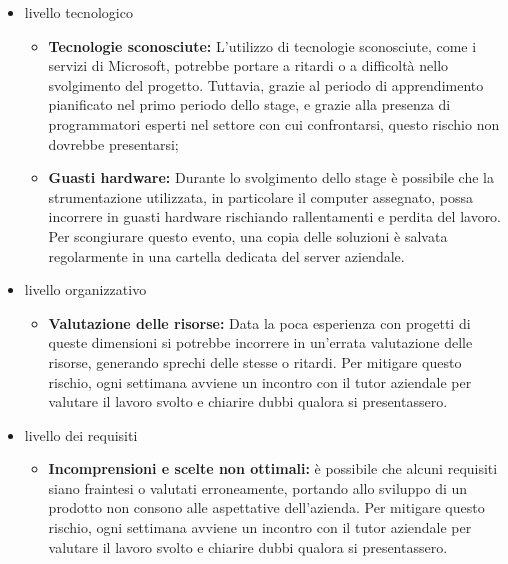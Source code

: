 \begin{itemize}
	\item livello tecnologico
	\begin{itemize}
		\item \textbf{Tecnologie sconosciute:} L'utilizzo di tecnologie sconosciute, come i servizi di Microsoft, potrebbe portare a ritardi o a difficoltà nello svolgimento del progetto. Tuttavia, grazie al periodo di apprendimento pianificato nel primo periodo dello stage, e grazie alla presenza di programmatori esperti nel settore con cui confrontarsi, questo rischio non dovrebbe presentarsi;
		\item \textbf{Guasti hardware:} Durante lo svolgimento dello stage è possibile che la strumentazione utilizzata, in particolare il computer assegnato, possa incorrere in guasti hardware rischiando rallentamenti e perdita del lavoro. Per scongiurare questo evento, una copia delle soluzioni è salvata regolarmente in una cartella dedicata del server aziendale.   
	\end{itemize}
	\item livello organizzativo
	\begin{itemize}
		\item \textbf{Valutazione delle risorse:} Data la poca esperienza con progetti di queste dimensioni si potrebbe incorrere in un'errata valutazione delle risorse, generando sprechi delle stesse o ritardi. Per mitigare questo rischio, ogni settimana avviene un incontro con il tutor aziendale per valutare il lavoro svolto e chiarire dubbi qualora si presentassero.
	\end{itemize}
	\item livello dei requisiti
	\begin{itemize}
		\item \textbf{Incomprensioni e scelte non ottimali:} è possibile che alcuni requisiti siano fraintesi o valutati erroneamente, portando allo sviluppo di un prodotto non consono alle aspettative dell'azienda. Per mitigare questo rischio, ogni settimana avviene un incontro con il tutor aziendale per valutare il lavoro svolto e chiarire dubbi qualora si presentassero.
	\end{itemize}
\end{itemize}

